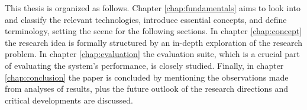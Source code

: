 This thesis is organized as follows. Chapter \ref{chap:fundamentals} aims to look into and classify the relevant technologies, introduce essential concepts, and define terminology, setting the scene for the following sections. In chapter \ref{chap:concept} the research idea is formally structured by an in-depth exploration of the research problem. In chapter \ref{chap:evaluation} the evaluation suite, which is a crucial part of evaluating the system's performance, is closely studied. Finally, in chapter \ref{chap:conclusion} the paper is concluded by mentioning the observations made from analyses of results, plus the future outlook of the research directions and critical developments are discussed.
